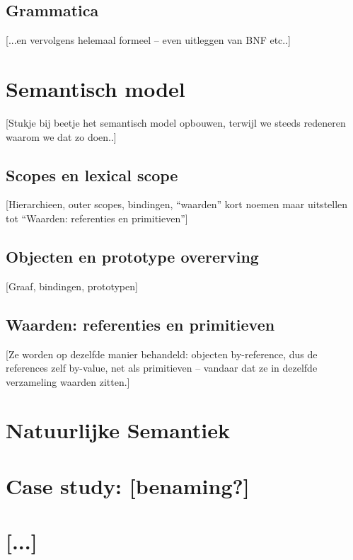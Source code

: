 \documentclass[11pt,oneside,parskip=half]{scrbook}
\newcommand{\<}
  {\ensuremath{\langle}}
\renewcommand{\>}
  {\ensuremath{\rangle}}
\begin{document}

\section{Grammatica}

[...en vervolgens helemaal formeel -- even uitleggen van BNF etc..]

\chapter{Semantisch model}

[Stukje bij beetje het semantisch model opbouwen, terwijl we steeds redeneren waarom we dat zo doen..]

\section{Scopes en lexical scope}

[Hierarchieen, outer scopes, bindingen, ``waarden'' kort noemen maar uitstellen tot ``Waarden: referenties en primitieven'']

\section{Objecten en prototype overerving}

[Graaf, bindingen, prototypen]

\section{Waarden: referenties en primitieven}

[Ze worden op dezelfde manier behandeld: objecten by-reference, dus de references zelf by-value, net als primitieven -- vandaar dat ze in dezelfde verzameling waarden zitten.]

\chapter{Natuurlijke Semantiek}

\chapter{Case study: [benaming?]}

\chapter{[...]}

%
%
%

\backmatter
\end{document}
